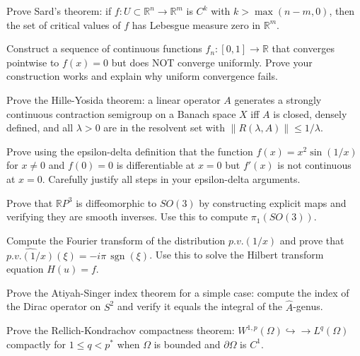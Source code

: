 \documentclass[12pt,a4paper]{exam}
\begin{document}
\begin{questions}

\question[4]
Prove Sard's theorem: if $f: U \subset \mathbb{R}^n \to \mathbb{R}^m$ is $C^k$ with $k > \max(n-m, 0)$, then the set of critical values of $f$ has Lebesgue measure zero in $\mathbb{R}^m$.

\vspace{0.3cm}

\question[4]
Construct a sequence of continuous functions $f_n: [0,1] \to \mathbb{R}$ that converges pointwise to $f(x) = 0$ but does NOT converge uniformly. Prove your construction works and explain why uniform convergence fails.

\vspace{0.3cm}

\question[3]
Prove the Hille-Yosida theorem: a linear operator $A$ generates a strongly continuous contraction semigroup on a Banach space $X$ iff $A$ is closed, densely defined, and all $\lambda > 0$ are in the resolvent set with $\|R(\lambda,A)\| \leq 1/\lambda$.

\vspace{0.3cm}

\question[5]
Prove using the epsilon-delta definition that the function $f(x) = x^2 \sin(1/x)$ for $x \neq 0$ and $f(0) = 0$ is differentiable at $x = 0$ but $f'(x)$ is not continuous at $x = 0$. Carefully justify all steps in your epsilon-delta arguments.

\vspace{0.3cm}

\question[3]
Prove that $\mathbb{R}P^3$ is diffeomorphic to $SO(3)$ by constructing explicit maps and verifying they are smooth inverses. Use this to compute $\pi_1(SO(3))$.

\vspace{0.3cm}

\question[3]
Compute the Fourier transform of the distribution $p.v.(1/x)$ and prove that $\widehat{p.v.(1/x)}(\xi) = -i\pi \, \operatorname{sgn}(\xi)$. Use this to solve the Hilbert transform equation $H(u) = f$.

\vspace{0.3cm}

\question[4]
Prove the Atiyah-Singer index theorem for a simple case: compute the index of the Dirac operator on $S^2$ and verify it equals the integral of the $\widehat{A}$-genus.

\vspace{0.3cm}

\question[3]
Prove the Rellich-Kondrachov compactness theorem: $W^{1,p}(\Omega) \hookrightarrow\!\!\!\to L^q(\Omega)$ compactly for $1 \leq q < p^*$ when $\Omega$ is bounded and $\partial\Omega$ is $C^1$.


\end{questions}
\end{document}
